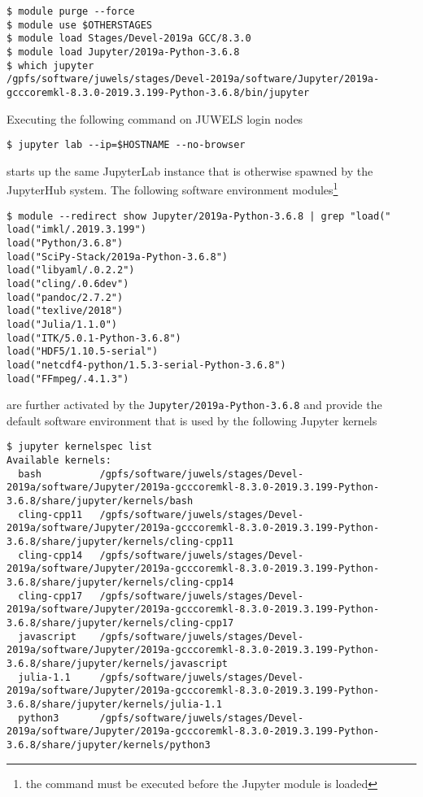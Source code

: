 \documentclass[11pt,a4paper]{article}
\begin{document}
\begin{verbatim}
$ module purge --force
$ module use $OTHERSTAGES
$ module load Stages/Devel-2019a GCC/8.3.0
$ module load Jupyter/2019a-Python-3.6.8
$ which jupyter
/gpfs/software/juwels/stages/Devel-2019a/software/Jupyter/2019a-gcccoremkl-8.3.0-2019.3.199-Python-3.6.8/bin/jupyter
\end{verbatim}

Executing the following command on JUWELS login nodes

\begin{verbatim}
$ jupyter lab --ip=$HOSTNAME --no-browser
\end{verbatim}

starts up the same JupyterLab instance that is otherwise spawned by the JupyterHub system.
The following software environment modules\footnote{the command must be executed before the Jupyter module is loaded}

\begin{verbatim}
$ module --redirect show Jupyter/2019a-Python-3.6.8 | grep "load("
load("imkl/.2019.3.199")
load("Python/3.6.8")
load("SciPy-Stack/2019a-Python-3.6.8")
load("libyaml/.0.2.2")
load("cling/.0.6dev")
load("pandoc/2.7.2")
load("texlive/2018")
load("Julia/1.1.0")
load("ITK/5.0.1-Python-3.6.8")
load("HDF5/1.10.5-serial")
load("netcdf4-python/1.5.3-serial-Python-3.6.8")
load("FFmpeg/.4.1.3")
\end{verbatim}

are further activated by the \verb|Jupyter/2019a-Python-3.6.8| and provide the default software environment that is used by the following Jupyter kernels

\begin{verbatim}
$ jupyter kernelspec list
Available kernels:
  bash          /gpfs/software/juwels/stages/Devel-2019a/software/Jupyter/2019a-gcccoremkl-8.3.0-2019.3.199-Python-3.6.8/share/jupyter/kernels/bash
  cling-cpp11   /gpfs/software/juwels/stages/Devel-2019a/software/Jupyter/2019a-gcccoremkl-8.3.0-2019.3.199-Python-3.6.8/share/jupyter/kernels/cling-cpp11
  cling-cpp14   /gpfs/software/juwels/stages/Devel-2019a/software/Jupyter/2019a-gcccoremkl-8.3.0-2019.3.199-Python-3.6.8/share/jupyter/kernels/cling-cpp14
  cling-cpp17   /gpfs/software/juwels/stages/Devel-2019a/software/Jupyter/2019a-gcccoremkl-8.3.0-2019.3.199-Python-3.6.8/share/jupyter/kernels/cling-cpp17
  javascript    /gpfs/software/juwels/stages/Devel-2019a/software/Jupyter/2019a-gcccoremkl-8.3.0-2019.3.199-Python-3.6.8/share/jupyter/kernels/javascript
  julia-1.1     /gpfs/software/juwels/stages/Devel-2019a/software/Jupyter/2019a-gcccoremkl-8.3.0-2019.3.199-Python-3.6.8/share/jupyter/kernels/julia-1.1
  python3       /gpfs/software/juwels/stages/Devel-2019a/software/Jupyter/2019a-gcccoremkl-8.3.0-2019.3.199-Python-3.6.8/share/jupyter/kernels/python3
\end{verbatim}
\end{document}

